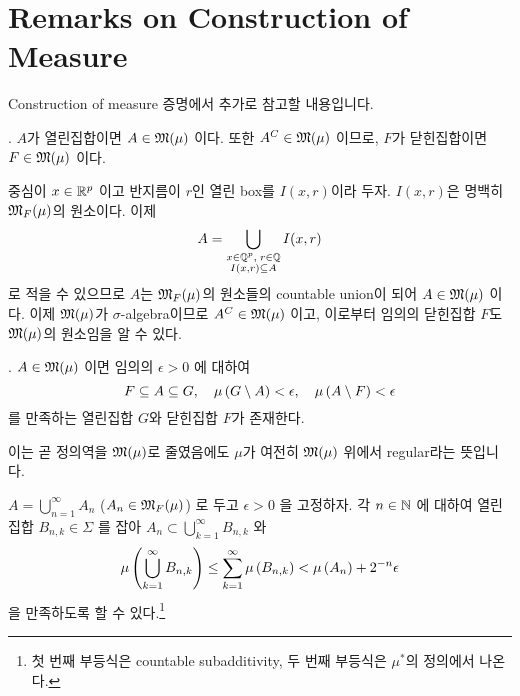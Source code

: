\begin{center}
\end{center}

\section*{Remarks on Construction of Measure}

Construction of measure 증명에서 추가로 참고할 내용입니다.

\prop. \(A\)가 열린집합이면 \(A \in \mathfrak{M}(\mu)\) 이다. 또한 \(A^C \in \mathfrak{M}(\mu)\) 이므로, \(F\)가 닫힌집합이면 \(F \in \mathfrak{M}(\mu)\) 이다.

\pf 중심이 \(x\in \mathbb{R}^p\) 이고 반지름이 \(r\)인 열린 box를 \(I(x, r)\)이라 두자. \(I(x, r)\)은 명백히 \(\mathfrak{M}_F(\mu)\)의 원소이다. 이제
\[
    A = \bigcup_{\substack{x \in \mathbb{Q}^p, \; r \in \mathbb{Q} \\ I(x, r)\subseteq A}} I(x, r)
\]
로 적을 수 있으므로 \(A\)는 \(\mathfrak{M}_F(\mu)\)의 원소들의 countable union이 되어 \(A \in \mathfrak{M}(\mu)\) 이다. 이제 \(\mathfrak{M}(\mu)\)가 \(\sigma\)-algebra이므로 \(A^C\in \mathfrak{M}(\mu)\) 이고, 이로부터 임의의 닫힌집합 \(F\)도 \(\mathfrak{M}(\mu)\)의 원소임을 알 수 있다.

\prop. \(A \in \mathfrak{M}(\mu)\) 이면 임의의 \(\epsilon > 0\) 에 대하여
\[
    F \subseteq A \subseteq G, \quad \mu\left( G \setminus A \right) < \epsilon, \quad \mu\left( A \setminus F \right) < \epsilon
\]
를 만족하는 열린집합 \(G\)와 닫힌집합 \(F\)가 존재한다.

이는 곧 정의역을 \(\mathfrak{M}(\mu)\)로 줄였음에도 \(\mu\)가 여전히 \(\mathfrak{M}(\mu)\) 위에서 regular라는 뜻입니다.

\pf \(A = \bigcup_{n=1}^\infty A_n\) (\(A_n \in \mathfrak{M}_F(\mu)\)) 로 두고 \(\epsilon > 0\) 을 고정하자. 각 \(n \in \mathbb{N}\) 에 대하여 열린집합 \(B_{n, k} \in \Sigma\) 를 잡아 \(A_n \subset \bigcup_{k=1}^\infty B_{n, k}\) 와
\[
    \mu\left( \bigcup_{k=1}^{\infty} B_{n, k} \right) \leq \sum_{k=1}^{\infty} \mu\left( B_{n, k} \right) < \mu\left( A_n \right) + 2^{-n}\epsilon
\]
을 만족하도록 할 수 있다.\footnote{첫 번째 부등식은 countable subadditivity, 두 번째 부등식은 \(\mu^\ast\)의 정의에서 나온다.}

